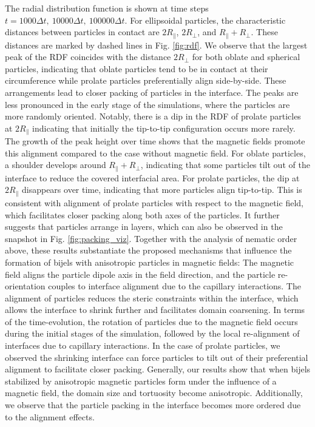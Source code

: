 The radial distribution function is shown at time steps
\(t=1000\Delta t,\ 10000\Delta t,\ 100000\Delta t\). For ellipsoidal
particles, the characteristic distances between particles in contact are
\(2R_{\parallel}\), \(2R_{\perp}\), and \(R_{\parallel} + R_{\perp}\).
These distances are marked by dashed lines in Fig. \ref{fig:rdf}. We
observe that the largest peak of the RDF coincides with the distance
\(2R_\perp\) for both oblate and spherical particles, indicating that
oblate particles tend to be in contact at their circumference while
prolate particles preferentially align side-by-side. These arrangements
lead to closer packing of particles in the interface. The peaks are less
pronounced in the early stage of the simulations, where the particles
are more randomly oriented. Notably, there is a dip in the RDF of
prolate particles at \(2R_\parallel\) indicating that initially the
tip-to-tip configuration occurs more rarely. The growth of the peak
height over time shows that the magnetic fields promote this alignment
compared to the case without magnetic field. For oblate particles, a
shoulder develops around \(R_\parallel+R_\perp\), indicating that some
particles tilt out of the interface to reduce the covered interfacial
area. For prolate particles, the dip at \(2R_\parallel\) disappears over
time, indicating that more particles align tip-to-tip. This is
consistent with alignment of prolate particles with respect to the
magnetic field, which facilitates closer packing along both axes of the
particles. It further suggests that particles arrange in layers, which can also be observed in the snapshot in Fig.
\ref{fig:packing_viz}. Together with the analysis of nematic order
above, these results substantiate the proposed mechanisms that influence
the formation of bijels with anisotropic particles in magnetic fields:
The magnetic field aligns the particle dipole axis in the field
direction, and the particle re-orientation couples to interface
alignment due to the capillary interactions. The alignment of particles
reduces the steric constraints within the interface, which allows the
interface to shrink further and facilitates domain coarsening. In terms
of the time-evolution, the rotation of particles due to the magnetic
field occurs during the initial stages of the simulation, followed by
the local re-alignment of interfaces due to capillary interactions. In
the case of prolate particles, we observed the shrinking interface can
force particles to tilt out of their preferential alignment to facilitate
closer packing. Generally, our results show that when bijels stabilized
by anisotropic magnetic particles form under the influence of a magnetic
field, the domain size and tortuosity become anisotropic. Additionally,
we observe that the particle packing in the interface becomes more
ordered due to the alignment effects.

